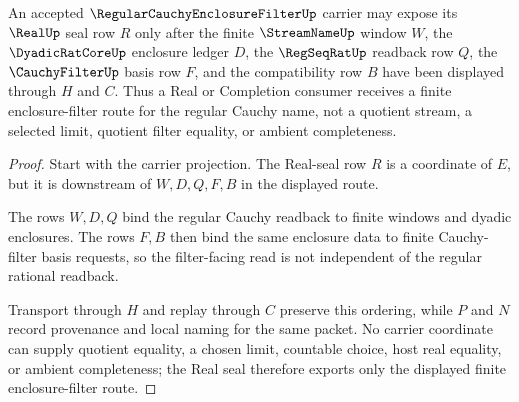 \begin{theorem}
\label{thm:regular-cauchy-enclosure-filter-real-seal-route}
An accepted $\RegularCauchyEnclosureFilterUp$ carrier may expose its $\RealUp$ seal row $R$ only after the finite $\StreamNameUp$ window $W$, the $\DyadicRatCoreUp$ enclosure ledger $D$, the $\RegSeqRatUp$ readback row $Q$, the $\CauchyFilterUp$ basis row $F$, and the compatibility row $B$ have been displayed through $H$ and $C$. Thus a Real or Completion consumer receives a finite enclosure-filter route for the regular Cauchy name, not a quotient stream, a selected limit, quotient filter equality, or ambient completeness.
\end{theorem}
\begin{proof}
Start with the carrier projection. The Real-seal row $R$ is a coordinate of $E$, but it is downstream of $W,D,Q,F,B$ in the displayed route.

The rows $W,D,Q$ bind the regular Cauchy readback to finite windows and dyadic enclosures. The rows $F,B$ then bind the same enclosure data to finite Cauchy-filter basis requests, so the filter-facing read is not independent of the regular rational readback.

Transport through $H$ and replay through $C$ preserve this ordering, while $P$ and $N$ record provenance and local naming for the same packet. No carrier coordinate can supply quotient equality, a chosen limit, countable choice, host real equality, or ambient completeness; the Real seal therefore exports only the displayed finite enclosure-filter route.
\end{proof}




